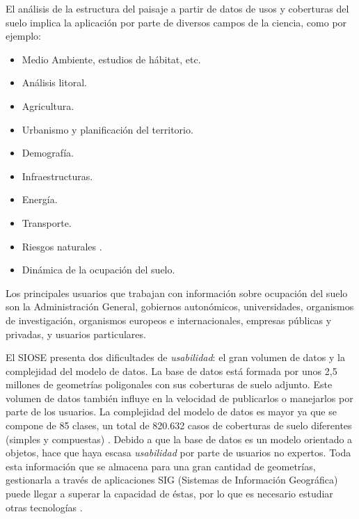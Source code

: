 El análisis de la estructura del paisaje a partir de datos de usos y coberturas del suelo implica la aplicación por parte de diversos campos de la ciencia, como por ejemplo:
\begin{itemize}
\item Medio Ambiente, estudios de hábitat, etc.
\item Análisis litoral.
\item Agricultura.
\item Urbanismo y planificación del territorio.
\item Demografía.
\item Infraestructuras.
\item Energía.
\item Transporte.
\item Riesgos naturales \cite{Vazquez2017}.
\item Dinámica de la ocupación del suelo.
\end{itemize}

Los principales usuarios que trabajan con información sobre ocupación del suelo son la Administración General, gobiernos autonómicos, universidades, organismos de investigación, organismos europeos e internacionales, empresas públicas y privadas, y usuarios particulares.

El SIOSE presenta dos dificultades de \textit{usabilidad}: el gran volumen de datos y la complejidad del modelo de datos. La base de datos está formada por unos 2,5 millones de geometrías poligonales con sus coberturas de suelo adjunto. Este volumen de datos también influye en la velocidad de publicarlos o manejarlos por parte de los usuarios. La complejidad del modelo de datos es mayor ya que se compone de 85 clases, un total de 820.632 casos de coberturas de suelo diferentes (simples y compuestas) \cite{FernandezVillarino2012}. Debido a que la base de datos es un modelo orientado a objetos, hace que haya escasa \textit{usabilidad} por parte de usuarios no expertos. Toda esta información que se almacena para una gran cantidad de geometrías, gestionarla a través de aplicaciones SIG (Sistemas de Información Geográfica) puede llegar a superar la capacidad de éstas, por lo que es necesario estudiar otras tecnologías \cite{NavarroCarrion2016}.

